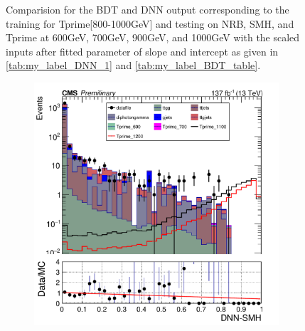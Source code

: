 \begin{figure}[H]
\begin{subfigure}[b]{0.47\textwidth}
         \label{fig:three sin x}
     \end{subfigure}
    \hfill
     \label{fig:}
     \caption{Comparision for the BDT and DNN output corresponding to the training for Tprime[800-1000GeV] and testing on NRB, SMH, and Tprime at 600GeV, 700GeV, 900GeV, and 1000GeV with the scaled inputs after fitted parameter of slope and intercept as given in \autoref{tab:my_label_DNN_1} and \autoref{tab:my_label_BDT_table}.}
\end{figure}



\begin{figure}[H]
     \centering
     \begin{subfigure}[b]{0.47\textwidth}
         \centering
         \includegraphics[width=\textwidth]{figure_4/Stacked_plot_DNN_1100-1200_with_diphoton_cuts_scaled_inputs.pdf}
         \label{fig:y equals x}
     \end{subfigure}
     \hfill
     \begin{subfigure}[b]{0.47\textwidth}
         \centering

\end{subfigure}
\end{figure}
